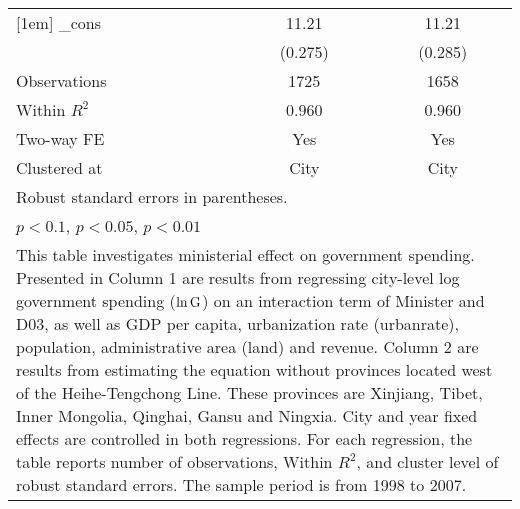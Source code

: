 \documentclass[11pt,a4paper]{article}
\begin{document}
\begin{center}
\begin{scriptsize}
{\begin{tabular}{l*{2}{c}}
[1em]
\_cons      &       11.21\sym{***}&       11.21\sym{***}\\
            &     (0.275)         &     (0.285)         \\
\hline
Observations      &        1725         &        1658         \\
Within $R^{2}$       &       0.960         &       0.960         \\
Two-way FE   &   Yes       &    Yes                \\
Clustered at   &        City         &        City      \\
\hline\hline
\multicolumn{3}{l}{\footnotesize Robust standard errors in parentheses.}\\
\multicolumn{3}{l}{\footnotesize \sym{*} \(p<0.1\), \sym{**} \(p<0.05\), \sym{***} \(p<0.01\)}\\
\multicolumn{3}{p{6.5cm}}{\footnotesize This table investigates ministerial effect on government spending. Presented in Column 1 are results from regressing city-level log government spending (\(\rm \ln{G}  \)) on an interaction term of Minister and D03, as well as GDP per capita, urbanization rate (urbanrate), population, administrative area (land) and revenue. Column 2 are results from estimating the equation without provinces located west of the Heihe-Tengchong Line. These provinces are Xinjiang, Tibet, Inner Mongolia, Qinghai, Gansu and Ningxia. City and year fixed effects are controlled in both regressions. For each regression, the table reports number of observations, Within $R^{2}$, and cluster level of robust standard errors. The sample period is from 1998 to 2007. }\\
\end{tabular}
}

\end{scriptsize}
\end{center}
\end{document}
